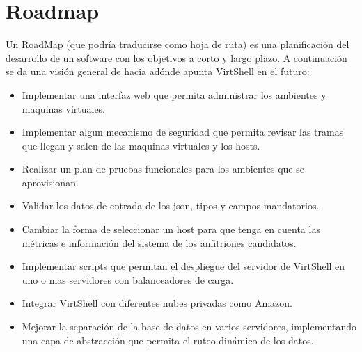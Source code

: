 
\chapter{Roadmap}
\label{roadmap}

Un RoadMap (que podría traducirse como hoja de ruta) es una planificación del desarrollo de un software con los objetivos a corto y largo plazo. A continuación se da una visión general de hacia adónde apunta VirtShell en el futuro:

\begin{itemize}
\item Implementar una interfaz web que permita administrar los ambientes y maquinas virtuales.
\item Implementar algun mecanismo de seguridad que permita revisar las tramas que llegan y salen de las maquinas virtuales y los hosts.
\item Realizar un plan de pruebas funcionales para los ambientes que se aprovisionan.
\item Validar los datos de entrada de los json, tipos y campos mandatorios.
\item Cambiar la forma de seleccionar un host para que tenga en cuenta las métricas e información del sistema de los anfitriones candidatos.
\item Implementar scripts que permitan el despliegue del servidor de VirtShell en uno o mas servidores con balanceadores de carga.
\item Integrar VirtShell con diferentes nubes privadas como Amazon.
\item Mejorar la separación de la base de datos en varios servidores, implementando una capa de abstracción que permita el ruteo dinámico de los datos.
\end{itemize}
        